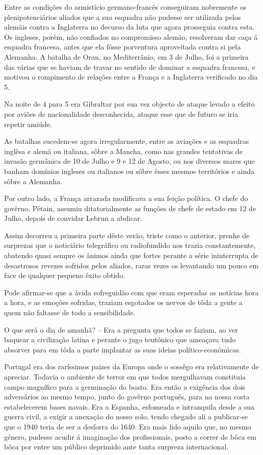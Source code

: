 \documentclass[9pt]{article}
\begin{document}
Entre as condi\-ções do armistício germano-francês conseguiram nobremente os plenipotenciários aliados que a sua esquadra não pudesse ser
utilizada pelos alemãis contra a Inglaterra no decurso da luta que agora
prosseguia contra esta. Os ingleses, porém, não confiados no compromisso
alemão, resolveram dar caça á esquadra francesa, antes que ela fôsse porventura aproveitada contra si pela Alemanha. A bata\-lha de Oran, no Mediterrânio, em 3 de Ju\-lho, foi a primeira das várias que se haviam de travar
no sentido de dominar a esquadra francesa, e motivou o rompimento de rela\-ções entre a Fran\-ça e a Inglaterra verifi\-cado no dia 5.

Na noite de 4 para 5 era Gibraltar por sua vez objecto de ataque
levado a efeito por aviões de na\-cio\-nalidade desconhecida, ataque esse que
de futuro se iria repetir amiúde.

As bata\-lhas sucedem-se agora irregularmente, entre as avia\-ções e as
esquadras inglêsa e alemã ou italiana, sôbre a Mancha, como nas gran\-des
tentativas de invasão germânica de 10 de Ju\-lho e 9 e 12 de Agosto, ou
nos diversos mares que banham domínios ingleses ou italianos ou sôbre
êsses mesmos territórios e ainda sôbre a Alemanha.

Por outro lado, a Fran\-ça arrazada modifi\-cava a sua fei\-ção política.
O chefe do govêrno, Pétain, assumiu ditatorialmente as fun\-ções de chefe
de estado em 12 de Ju\-lho, depois de convidar Lebrun a abdicar.

Assim decorreu a primeira parte dêste verão, triste como o anterior,
prenhe de surprezas que o noticiário telegráfico ou radiofundido nos
trazia constantemente, abatendo quasi sempre os ânimos ainda que fortes
perante a série ininterrupta de desastrosos revezes sofridos pelos aliados, raras vezes os levantando um pouco em face de qualquer pequeno êxito
obtido.

Pode afirmar-se que a ávida sofreguidão com que eram esperadas as
notícias hora a hora, e as emo\-ções sofridas, traziam esgotados os nervos
de tôda a gente a quem não faltasse de todo a sensibilidade.

O que será o dia de a\-ma\-nhã? -- Era a pregunta que todos se faziam,
ao ver baquear a civiliza\-ção latina e perante o jugo teutónico que ameaçava tudo absorver para em tôda a parte implantar as suas ideias político-económicas.

\fotoD

Portugal era dos rarís\-si\-mos paizes da Europa onde o sossêgo era
relativamente de apreciar. Todavia o ambiente de terror em que todos
mergu\-lhavam constituia campo magnífico para a germina\-ção do boato. Era
então a exi\-gên\-cia dos dois adversários ao mesmo tempo, junto do govêrno
por\-tu\-guês, para na nossa costa estabelecerem bases navais. Era a Espanha,
esfomeada e intranquila desde a sua guerra civil, a exigir a anexa\-ção
do nosso solo, tendo chegado ali a publicar-se que o 1940 teria de ser
a desforra do 1640. Era mais lido aquilo que, no mesmo género, pudesse
acudir á imagina\-ção dos profissionais, posto a correr de bôca em bôca
por entre um público deprimido ante tanta surpreza interna\-cio\-nal.
\end{document}
